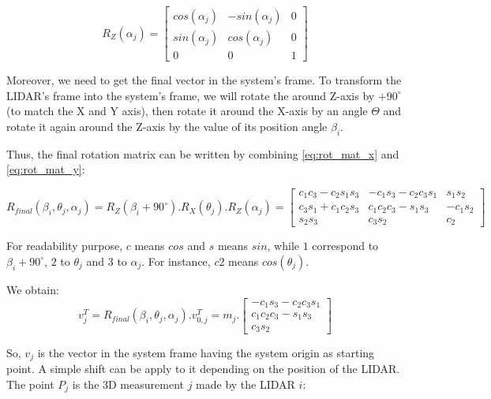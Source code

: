 \documentclass{article}
\newcommand{\vsp}{\vspace{\baselineskip}}
\begin{document}
\begin{equation}
\label{eq:rot_mat_y}
    R_Z(\alpha_j) = 
    \begin{bmatrix}
        cos(\alpha_j) & -sin(\alpha_j) & 0 \\
        sin(\alpha_j) & cos(\alpha_j) & 0 \\
        0 & 0 & 1
    \end{bmatrix}
\end{equation}

Moreover, we need to get the final vector in the system's frame. To transform the LIDAR's frame into the system's frame, we will rotate the around Z-axis by $+90^\circ$ (to match the X and Y axis), then rotate it around the X-axis by an angle $\Theta$ and rotate it again around the Z-axis by the value of its position angle $\beta_i$. 

\vsp

Thus, the final rotation matrix can be written by combining \ref{eq:rot_mat_x} and \ref{eq:rot_mat_y}:

\begin{equation}
    R_{final}(\beta_i,\theta_j,\alpha_j) = 
    R_Z(\beta_i+90^\circ).R_X(\theta_j).R_Z(\alpha_j) =
    \begin{bmatrix}
        c_1c_3 - c_2s_1s_3 & -c_1s_3-c_2c_3s_1 & s_1s_2 \\
        c_3s_1 + c_1c_2s_3 & c_1c_2c_3-s_1s_3 & -c_1s_2 \\
        s_2s_3 & c_3s_2 & c_2
    \end{bmatrix}
\end{equation}

For readability purpose, $c$ means $cos$ and $s$ means $sin$, while $1$ correspond to $\beta_i+90^\circ$, $2$ to $\theta_j$ and $3$ to $\alpha_j$. For instance, $c2$ means $cos(\theta_j)$.

\vsp

We obtain:
\begin{equation}
    v_j^T = R_{final}(\beta_i,\theta_j,\alpha_j).v_{0,j}^T = m_j.
     \begin{bmatrix}
        -c_1s_3-c_2c_3s_1\\
        c_1c_2c_3-s_1s_3 \\
        c_3s_2
    \end{bmatrix}
\end{equation}

So, $v_j$ is the vector in the system frame having the system origin as starting point. A simple shift can be apply to it depending on the position of the LIDAR. The point $P_j$ is the 3D measurement $j$ made by the LIDAR $i$:
\end{document}
